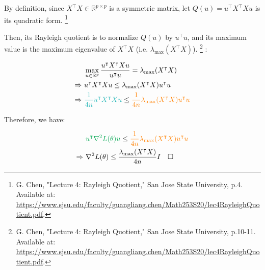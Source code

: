\documentclass{article}
\begin{document}
By definition, since $X^\intercal X \in \mathbb{R}^{p \times p}$ is a symmetric matrix,
let $Q(u) = u^\intercal X^\intercal X u$ is its quadratic form.
\footnote{G. Chen, "Lecture 4: Rayleigh Quotient," San Jose State University, p.4. Available at: \url{https://www.sjsu.edu/faculty/guangliang.chen/Math253S20/lec4RayleighQuotient.pdf}.}
\bigskip

Then, its Rayleigh quotient is to normalize $Q(u)$ by $u^\intercal u$, 
and its maximum value is the maximum eigenvalue of $X^\intercal X$ (i.e. $\lambda_{\max}(X^\intercal X)$).
\footnote{G. Chen, "Lecture 4: Rayleigh Quotient," San Jose State University, p.10-11. Available at: \url{https://www.sjsu.edu/faculty/guangliang.chen/Math253S20/lec4RayleighQuotient.pdf}.}
:

\begin{align*}
    &\max_{u \in \mathbb{R}^p} \frac{u^\intercal X^\intercal X u}{u^\intercal u}
    = \lambda_{\max}(X^\intercal X) \\
    \Rightarrow \ & u^\intercal X^\intercal X u
    \leq \lambda_{\max}(X^\intercal X) u^\intercal u \\
    \Rightarrow \ & \textcolor{BlueGreen}{\frac{1}{4n} u^\intercal X^\intercal X u}
    \leq \textcolor{orange}{\frac{1}{4n} \lambda_{\max}(X^\intercal X) u^\intercal u} \\
\end{align*}

Therefore, we have:

\begin{align*}
    &\textcolor{Green}{u^\intercal \nabla^2 L (\theta) u} 
    \leq \textcolor{orange}{\frac{1}{4n} \lambda_{\max}(X^\intercal X) u^\intercal u} \\
    \Rightarrow \ & \nabla^2 L (\theta) \leq \frac{\lambda_{\max}(X^\intercal X)}{4n} I \quad \square
\end{align*}
\end{document}

